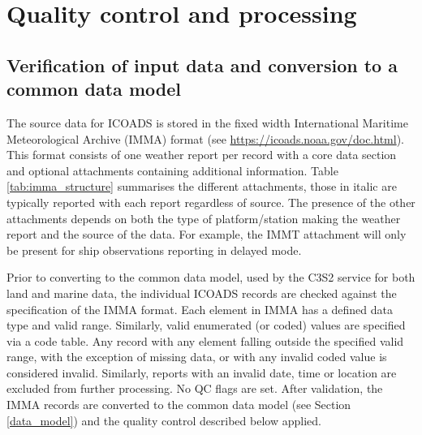 \section{Quality control and processing} \label{processing}
\subsection{Verification of input data and conversion to a common data model}\label{format-check}
The source data for ICOADS is stored in the fixed width International Maritime Meteorological Archive (IMMA) format (see \url{https://icoads.noaa.gov/doc.html}). 
This format consists of one weather report per record with a core data section and optional attachments containing additional information.
Table \ref{tab:imma_structure} summarises the different attachments, those in italic are typically reported with each report regardless of source. 
The presence of the other attachments depends on both the type of platform/station making the weather report and the source of the data. 
For example, the IMMT attachment will only be present for ship observations reporting in delayed mode.

Prior to converting to the common data model, used by the C3S2 service for both land and marine data, the individual ICOADS records are checked against the specification of the IMMA format. 
Each element in IMMA has a defined data type and valid range. 
Similarly, valid enumerated (or coded) values are specified via a code table.
Any record with any element falling outside the specified valid range, with the exception of missing data, or with any invalid coded value is considered invalid.
Similarly, reports with an invalid date, time or location are excluded from further processing. No QC flags are set.
After validation, the IMMA records are converted to the common data model (see Section \ref{data_model}) and the quality control described below applied.

